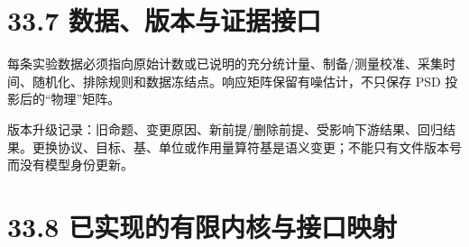 \documentclass[
  11pt,
  oneside]{book}
\begin{document}
\hypertarget{ux6570ux636eux7248ux672cux4e0eux8bc1ux636eux63a5ux53e3}{%
\section{33.7
数据、版本与证据接口}\label{ux6570ux636eux7248ux672cux4e0eux8bc1ux636eux63a5ux53e3}}

每条实验数据必须指向原始计数或已说明的充分统计量、制备/测量校准、采集时间、随机化、排除规则和数据冻结点。响应矩阵保留有噪估计，不只保存
PSD 投影后的``物理''矩阵。

版本升级记录：旧命题、变更原因、新前提/删除前提、受影响下游结果、回归结果。更换协议、目标、基、单位或作用量算符基是语义变更；不能只有文件版本号而没有模型身份更新。

\hypertarget{ux5df2ux5b9eux73b0ux7684ux6709ux9650ux5185ux6838ux4e0eux63a5ux53e3ux6620ux5c04}{%
\section{33.8
已实现的有限内核与接口映射}\label{ux5df2ux5b9eux73b0ux7684ux6709ux9650ux5185ux6838ux4e0eux63a5ux53e3ux6620ux5c04}}
\end{document}

